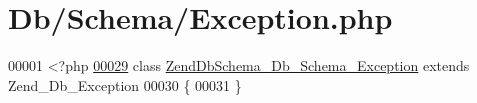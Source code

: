 \hypertarget{Exception_8php_source}{\section{\-Db/\-Schema/\-Exception.php}
}

\begin{DoxyCode}
00001 <?php
\hypertarget{Exception_8php_source_l00029}{}\hyperlink{classZendDbSchema__Db__Schema__Exception}{00029} \textcolor{keyword}{class }\hyperlink{classZendDbSchema__Db__Schema__Exception}{ZendDbSchema_Db_Schema_Exception} \textcolor{keyword}{extends} Zend\_Db\_Exception
00030 \{
00031 \}
\end{DoxyCode}
